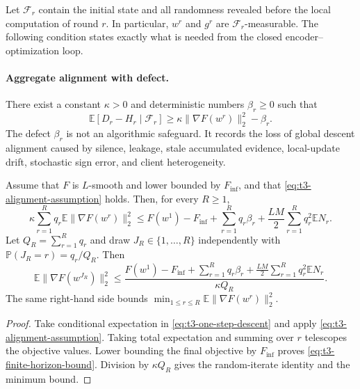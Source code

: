 Let $\mathcal{F}_r$ contain the initial state and all randomness revealed before
the local computation of round $r$.  In particular, $w^r$ and $g^r$ are
$\mathcal{F}_r$-measurable.  The following condition states exactly what is
needed from the closed encoder--optimization loop.

\paragraph{Aggregate alignment with defect.}
There exist a constant $\kappa>0$ and deterministic numbers $\beta_r\geq0$
such that
\begin{equation}
    \mathbb{E}[D_r-H_r\mid\mathcal{F}_r]
    \geq
    \kappa\|\nabla F(w^r)\|_2^2-\beta_r.
    \label{eq:t3-alignment-assumption}
\end{equation}
The defect $\beta_r$ is not an algorithmic safeguard.  It records the loss of
global descent alignment caused by silence, leakage, stale accumulated
evidence, local-update drift, stochastic sign error, and client heterogeneity.

\begin{proposition}
\label{prop:t3-finite-horizon}
Assume that $F$ is $L$-smooth and lower bounded by $F_{\inf}$, and that
\eqref{eq:t3-alignment-assumption} holds.  Then, for every $R\geq1$,
\begin{equation}
    \kappa\sum_{r=1}^{R}q_r
    \mathbb{E}\|\nabla F(w^r)\|_2^2
    \leq
    F(w^1)-F_{\inf}
    +\sum_{r=1}^{R}q_r\beta_r
    +\frac{LM}{2}\sum_{r=1}^{R}q_r^2\mathbb{E}N_r.
    \label{eq:t3-finite-horizon-bound}
\end{equation}
Let $Q_R=\sum_{r=1}^{R}q_r$ and draw $J_R\in\{1,\ldots,R\}$ independently
with $\mathbb{P}(J_R=r)=q_r/Q_R$.  Then
\begin{equation}
    \mathbb{E}\|\nabla F(w^{J_R})\|_2^2
    \leq
    \frac{
      F(w^1)-F_{\inf}
      +\sum_{r=1}^{R}q_r\beta_r
      +\frac{LM}{2}\sum_{r=1}^{R}q_r^2\mathbb{E}N_r
    }{\kappa Q_R}.
    \label{eq:t3-random-iterate-bound}
\end{equation}
The same right-hand side bounds
$\min_{1\leq r\leq R}\mathbb{E}\|\nabla F(w^r)\|_2^2$.
\end{proposition}

\begin{proof}
Take conditional expectation in \eqref{eq:t3-one-step-descent} and apply
\eqref{eq:t3-alignment-assumption}.  Taking total expectation and summing over
$r$ telescopes the objective values.  Lower bounding the final objective by
$F_{\inf}$ proves \eqref{eq:t3-finite-horizon-bound}.  Division by $\kappa Q_R$
gives the random-iterate identity and the minimum bound.
\end{proof}

